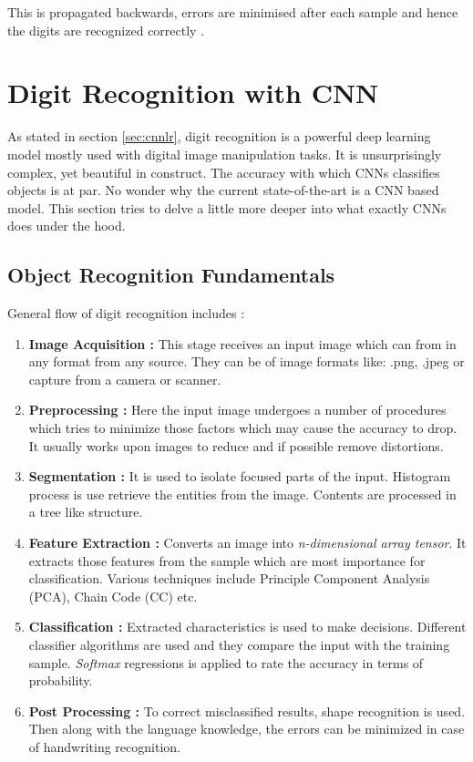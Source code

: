 \documentclass[12pt, a4paper]{report}
\begin{document}
This is propagated backwards, errors are minimised after each sample and hence the digits are recognized correctly \cite{yt:3b1b:nnp1}.

\section{Digit Recognition with CNN}
\label{sec:cnn}

\hspace{0.5cm} As stated in section \eqref{sec:cnnlr}, digit recognition is a powerful deep learning model mostly used with digital image manipulation tasks. It is unsurprisingly complex, yet beautiful in construct. The accuracy with which CNNs classifies objects is at par. No wonder why the current state-of-the-art is a CNN based model. This section tries to delve a little more deeper into what exactly CNNs does under the hood.

\subsection{Object Recognition Fundamentals}
\label{subsec:objrecfund}
General flow of digit recognition includes \cite{art:medium:hdreccnn}:
\begin{enumerate}
    \item \textbf{Image Acquisition :}  This stage receives an input image which can from in any format from any source. They can be of image formats like: .png, .jpeg or capture from a camera or scanner.
    \item \textbf{Preprocessing :} Here the input image undergoes a number of procedures which tries to minimize those factors which may cause the accuracy to drop. It usually works upon images to reduce and if possible remove distortions.
    \item \textbf{Segmentation :} It is used to isolate focused parts of the input. Histogram process is use retrieve the entities from the image. Contents are processed in a tree like structure.
    \item \textbf{Feature Extraction :} Converts an image into \emph{n-dimensional array tensor}. It extracts those features from the sample which are most importance for classification. Various techniques include Principle Component Analysis (PCA), Chain Code (CC) etc.
    \item \textbf{Classification :} Extracted characteristics is used to make decisions. Different classifier algorithms are used and they compare the input with the training sample. \emph{Softmax} regressions is applied to rate the accuracy in terms of probability.
    \item \textbf{Post Processing :} To correct misclassified results, shape recognition is used. Then along with the language knowledge, the errors can be minimized in case of handwriting recognition.
\end{enumerate}
\end{document}
